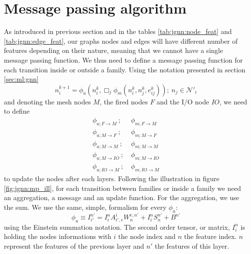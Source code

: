 \documentclass[../main.tex]{subfiles}
\begin{document}
\section{Message passing algorithm}
\label{sec:jgnn:mpa}
As introduced in previous section and in the tables \ref{tab:jgnn:node_feat} and \ref{tab:jgnn:edge_feat}, our graphs nodes and edges will have different number of features depending on their nature, meaning that we cannot have a single message passing function. We thus need to define a message passing function for each transition inside or outside a family. Using the notation presented in section \ref{sec:ml:gnn}
\begin{equation}
  \label{eq:jgnn:gen_mp}
  n_i^{k+1} = \phi_u (n_i^k, \Box_j \phi_m(n_i^k, n_j^k, e^k_{ij})); ~ n_j \in \mathcal{N}'_i
\end{equation}
and denoting the mesh nodes $M$, the fired nodes $F$ and the I/O node $IO$, we need to define
\begin{align*}
  \phi_{u; F\rightarrow M}  ~;~ &\phi_{m; F\rightarrow M} \\
  \phi_{u; M\rightarrow F}  ~;~ &\phi_{m; M\rightarrow F} \\
  \phi_{u; M\rightarrow M}  ~;~ &\phi_{m; M\rightarrow M} \\
  \phi_{u; M\rightarrow IO} ~;~ &\phi_{m; M\rightarrow IO} \\
  \phi_{u; IO\rightarrow M} ~;~ &\phi_{m; IO\rightarrow M}
\end{align*}
to update the nodes after each layers. Following the illustration in figure \ref{fig:jgnn:mp_ill}, for each transition between families or inside a family we need an aggregation, a message and an update function. For the aggregation, we use the sum. We use the same, simple, formalism for every $\phi_u$:
\begin{equation}
  \label{eq:jgnn:custom_mp}
  \phi_u \equiv I^{n'}_{i'} = I^n_i A_{i',e}^{i} W_n^{e,n'} + I^n_i S^{n'}_{n} + B^{n'}
\end{equation}
using the Einstein summation notation. The second order tensor, or matrix, $I^{n}_i$ is holding the nodes informations with $i$ the node index and $n$ the feature index. $n$ represent the features of the previous layer and $n'$ the features of this layer.
\end{document}
